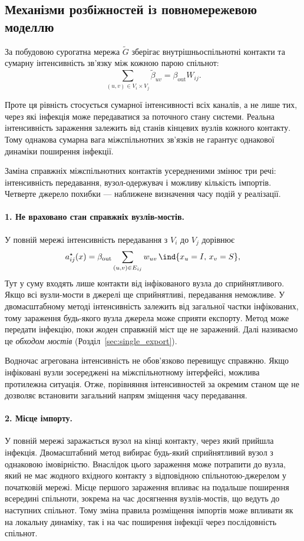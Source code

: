 \subsection{Механізми розбіжностей із повномережевою моделлю }
\label{sec:sources}

За побудовою сурогатна мережа $\tilde G$ зберігає внутрішньоспільнотні контакти та сумарну інтенсивність зв'язку між кожною парою спільнот:
\[
\sum_{(u,v)\in V_i\times V_j}\tilde\beta_{uv}
=
\beta_{\mathrm{out}}W_{ij}.
\]

Проте ця рівність стосується сумарної інтенсивності всіх каналів, а не лише тих, через які інфекція може передаватися за поточного стану системи. Реальна інтенсивність зараження залежить від станів кінцевих вузлів кожного контакту. Тому однакова сумарна вага міжспільнотних зв'язків не гарантує однакової динаміки поширення інфекції.

Заміна справжніх міжспільнотних контактів усередненими змінює три речі: інтенсивність передавання, вузол-одержувач і можливу кількість імпортів. Четверте джерело похибки --- наближене визначення часу подій у реалізації.


\paragraph{1. Не враховано стан справжніх вузлів-мостів.}
У повній мережі інтенсивність передавання з $V_i$ до $V_j$ дорівнює
\begin{equation}
\label{eq:exact_rate}
a^\star_{ij}(x)=\beta_{\mathrm{out}}\sum_{(u,v)\in E_{ij}}w_{uv}\,\ind\{x_u=I,\,x_v=S\},
\end{equation}
Тут у суму входять лише контакти від інфікованого вузла до сприйнятливого. Якщо всі вузли-мости в джерелі ще сприйнятливі, передавання неможливе. У двомасштабному методі інтенсивність залежить від загальної частки інфікованих, тому зараження будь-якого вузла джерела може сприяти експорту. Метод може передати інфекцію, поки жоден справжній міст ще не заражений. Далі називаємо це \emph{обходом мостів} (Розділ~\ref{sec:single_export}).

Водночас агрегована інтенсивність не обов'язково перевищує справжню. Якщо інфіковані вузли зосереджені на міжспільнотному інтерфейсі, можлива протилежна ситуація. Отже, порівняння інтенсивностей за окремим станом ще не дозволяє встановити загальний напрям зміщення часу передавання.

\paragraph{2. Місце імпорту.}
У повній мережі заражається вузол на кінці контакту, через який прийшла інфекція. Двомасштабний метод вибирає будь-який сприйнятливий вузол з однаковою імовірністю. 
Внаслідок цього зараження може потрапити до вузла, який не має жодного вхідного контакту з відповідною спільнотою-джерелом у початковій мережі. Місце першого зараження впливає на подальше поширення всередині спільноти, зокрема на час досягнення вузлів-мостів, що ведуть до наступних спільнот. Тому зміна правила розміщення імпортів може впливати як на локальну динаміку, так і на час поширення інфекції через послідовність спільнот.



